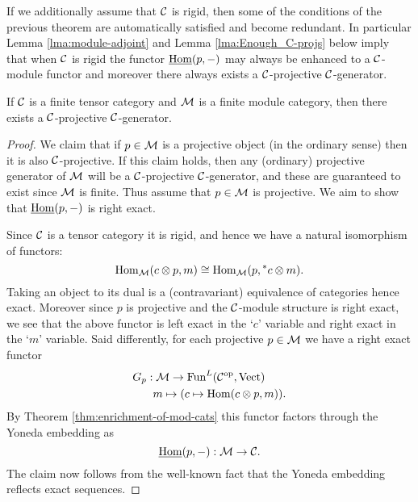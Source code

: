 \documentclass{amsart}
\begin{document}

If we additionally assume that $\mathcal C$ is rigid, then some of the conditions of the previous theorem are automatically satisfied and become redundant. In particular Lemma \ref{lma:module-adjoint} and Lemma \ref{lma:Enough_C-projs} below imply that when $\mathcal C$ is rigid the functor $\operatorname{\underline{Hom}}(p,-)$ may always be enhanced to a $\mathcal C$-module functor and moreover there always exists a $\mathcal C$-projective $\mathcal C$-generator.

\begin{lemma}{\cite[\S 2.11]{EGNO}} \label{lma:Enough_C-projs}
	If $\mathcal C$ is a finite tensor category and $\mathcal M$ is a finite module category, then there exists a $\mathcal C$-projective $\mathcal C$-generator. 
\end{lemma}  

\begin{proof}
	We claim that if $p \in \mathcal M$ is a projective object (in the ordinary sense) then it is also $\mathcal C$-projective. If this claim holds, then any (ordinary) projective generator of $\mathcal M$ will be a $\mathcal C$-projective $\mathcal C$-generator, and these are guaranteed to exist since $\mathcal M$ is finite. Thus assume that $p \in \mathcal M$ is projective.  We aim to show that $\operatorname{\underline{Hom}}(p, -)$ is right exact. 
	
	Since $\mathcal C$ is a tensor category it is rigid, and hence we have a natural isomorphism of functors:
\begin{equation*}
	\operatorname{Hom}_{\mathcal M}(c \otimes p, m) \cong \operatorname{Hom}_{\mathcal M}(p, {}^*c \otimes m).
\end{equation*}
Taking an object to its dual is a (contravariant) equivalence of categories hence exact. Moreover since $p$ is projective and the $\mathcal C$-module structure is right exact, we see that the above functor is left exact in the `$c$' variable and right exact in the `$m$' variable. Said differently, for each projective $p \in \mathcal M$ we have a right exact functor
\begin{align*}
	G_p: & \; \mathcal M \to \operatorname{Fun}^L(\mathcal C^{\mathrm{op}}, \mathrm{Vect}) \\
	& m \mapsto (c \mapsto \operatorname{Hom}(c \otimes p, m)).
\end{align*}
By Theorem \ref{thm:enrichment-of-mod-cats} this functor factors through the Yoneda embedding as
\begin{equation*}
	\operatorname{\underline{Hom}}(p, -): \mathcal M \to \mathcal C.
\end{equation*}
The claim now follows from the well-known fact that the Yoneda embedding reflects exact sequences. 
\end{proof}
\end{document}
